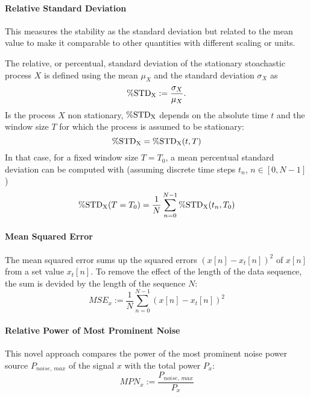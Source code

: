 \paragraph{Relative Standard Deviation}
This measures the stability as the standard deviation but related to the mean value to make it comparable to other quantities with different scaling or units.

The relative, or percentual, standard deviation of the stationary stoachastic process $X$ is defined using the mean $\mu_X$ and the standard deviation $\sigma_X$ as
\begin{equation}
\operatorname{\%STD_X} := \frac{\sigma_X}{\mu_X}.
\end{equation}
Is the process $X$ non stationary, $\operatorname{\%STD_X}$ depends on the absolute time $t$ and the window size $T$ for which the process is assumed to be stationary:
\begin{equation}
\operatorname{\%STD_X} = \operatorname{\%STD_X}(t,T)
\end{equation}
In that case, for a fixed window size $T=T_0$, a mean percentual standard deviation can be computed with (assuming discrete time steps $t_n$, $n\in[0,N-1]$)
\begin{equation}
\operatorname{\%STD_X}(T=T_0) = \frac{1}{N} \sum_{n=0}^{N-1} \operatorname{\%STD_X}(t_n,T_0)
\end{equation}

\paragraph{Mean Squared Error}
The mean squared error sums up the squared errors $\left(x[n] - x_t[n]\right)^2$ of $x[n]$ from a set value $x_t[n]$. To remove the effect of the length of the data sequence, the sum is devided by the length of the sequence $N$:
\begin{equation}
MSE_x := \frac{1}{N} \sum_{n=0}^{N-1} \left(x[n] - x_t[n]\right)^2
\end{equation}

\paragraph{Relative Power of Most Prominent Noise}
This novel approach compares the power of the most prominent noise power source $P_{noise,\,max}$ of the signal $x$ with the total power $P_x$:
\begin{equation}
MPN_x := \frac{P_{noise,\,max}}{P_x}
\end{equation}

